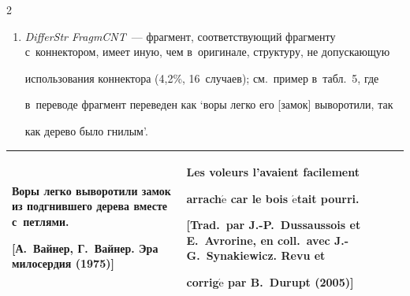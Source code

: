 \begin{multicols}{2}
\begin{enumerate}[1.]
как был канун праздников'.








\item \textit{DifferStr FragmCNT}~--- фрагмент, соответст\-ву\-ющий фрагменту с~коннектором, имеет иную, чем в~оригинале, структуру, не допускающую 


использования коннектора (4,2\%, 16~случаев); см.\ пример в~табл.~5, где 


в~переводе фрагмент переведен как `воры легко его [замок] выворотили, так 


как дерево было гнилым'.


\end{enumerate}





\begin{table}\small %


\begin{center}




\vspace*{2ex}





\begin{tabular}{|p{78mm}|p{78mm}|}


\hline


Воры легко выворотили замок из подгнившего дерева вместе с~петлями.\newline 


[А.~Вайнер, Г.~Вайнер. Эра милосердия (1975)]&Les voleurs l'avaient facilement 


arrach$\acute{\mbox{e}}$ \textbf{car} le bois $\acute{\mbox{e}}$tait pourri. \newline


[Trad.\ par J.-P.~Dussaussois et E.~Avrorine, en coll.\ avec J.-G.~Synakiewicz. Revu et 


corrig$\acute{\mbox{e}}$ par B.~Durupt (2005)]\\


\hline


\end{tabular}


\end{center}



\end{table}
\end{multicols}
